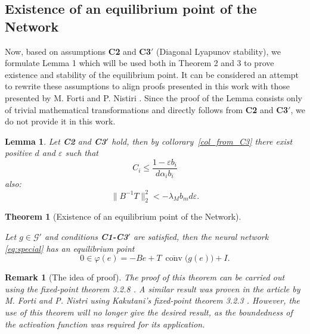 \documentclass[journal]{IEEEtran}
\theoremstyle{myplain}
\newtheorem{theorem}{Theorem}
\newtheorem{lemma}{Lemma}
\newtheorem{remark}{Remark}
\begin{document}
\subsection*{Existence of an equilibrium point of the Network}
Now, based on assumptions \textbf{C2} and \textbf{C3$'$} (Diagonal Lyapunov stability), we formulate Lemma 1 which will be used both in Theorem 2 and 3 to prove existence and stability of the equilibrium point. It can be considered an attempt to rewrite these assumptions to align proofs presented in this work with those presented by M. Forti and P. Nistiri \cite{p1}. Since the proof of the Lemma consists only of trivial mathematical transformations and directly follows from \textbf{C2} and \textbf{C3$'$}, we do not provide it in this work.  \\
\begin{lemma}\label{main_lemma}
    \textnormal{Let \textbf{C2} and \textbf{C3$'$} hold, then by collorary~\ref{col_from_C3} there exist positive $d$ and $\varepsilon$ such that}
    \begin{equation*}\label{2.3.2}
        C_i \leqslant \frac {1 -\varepsilon b_i}{d\alpha_i b_i}
    \end{equation*}
    \textnormal{also:}
    \begin{equation}\label{2.3.3}   
     \|B^{-1} T\|^2_2 < {-\lambda_M b_m}d  \varepsilon.  
    \end{equation}
   
    
\end{lemma}

\begin{theorem}[Existence of an equilibrium point of the Network]\label{exists}

Let $g\in \mathcal{G'}$ and conditions \textbf{C1-C3$'$} are satisfied, then the neural network \eqref{eq:special} has an equilibrium point
\begin{equation*}
	0\in\varphi(e)=-Be+T ~ \overline{\operatorname{conv}}\big(g(e)\big)+I.
\end{equation*}

\end{theorem}

\begin{remark} [The idea of proof]
The proof of this theorem can be carried out using the fixed-point theorem 3.2.8 \cite[p. 90]{p3}. A similar result was proven in the article by M. Forti and P. Nistri \cite{p1} using Kakutani's fixed-point theorem 3.2.3 \cite[p. 87]{p3}. However, the use of this theorem will no longer give the desired result, as the boundedness of the activation function was required for its application.
\end{remark}
\end{document}
